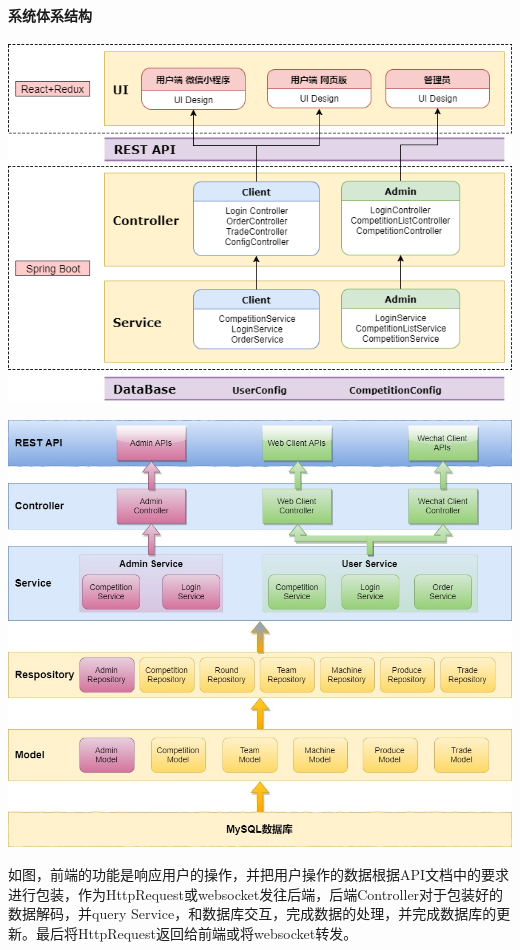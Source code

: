 \documentclass{article}
\begin{document}
                \paragraph{系统体系结构}
                    \includegraphics[scale = .3]{fig/架构图.png}

                    \includegraphics[scale = .3]{fig/有用.jpeg}

                    如图，前端的功能是响应用户的操作，并把用户操作的数据根据API文档中的要求进行包装，作为HttpRequest或websocket发往后端，后端Controller对于包装好的数据解码，并query Service，和数据库交互，完成数据的处理，并完成数据库的更新。最后将HttpRequest返回给前端或将websocket转发。
\end{document}

